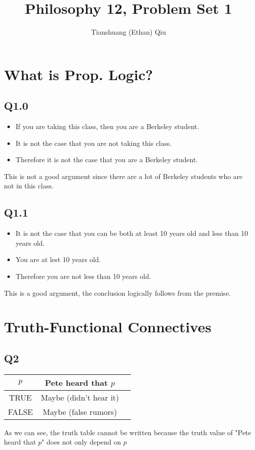 \documentclass[12pt]{article}
\author{Tianshuang (Ethan) Qiu}
\begin{document}
\title{Philosophy 12, Problem Set 1}
\maketitle
\newpage

\section{What is Prop. Logic?}
\subsection{Q1.0}
\begin{itemize}
    \item If you are taking this class, then you are a Berkeley student.
    \item It is not the case that you are not taking this class.
    \item Therefore it is not the case that you are a Berkeley student.
\end{itemize}
This is not a good argument since there are a lot of Berkeley students who 
are not in this class.

\subsection{Q1.1}
\begin{itemize}
    \item It is not the case that you can be both at least 10 years old and less than 10 years old.
    \item You are at lest 10 years old.
    \item Therefore you are not less than 10 years old.
\end{itemize}
This is a good argument, the conclusion logically follows from the premise.

\section{Truth-Functional Connectives}
\subsection{Q2}

\begin{tabular}{ | c | c | c |}
    \hline
    $p$ & Pete heard that $p$ \\
    \hline
    TRUE & Maybe (didn't hear it) \\
    \hline
    FALSE & Maybe (false rumors) \\
    \hline
\end{tabular}
\newline
As we can see, the truth table cannot be written because the truth value of 
"Pete heard that $p$" does not only depend on $p$
    
\end{document}

